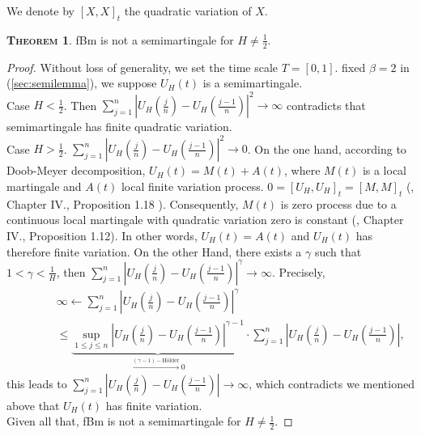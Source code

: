 \documentclass[a4paper, twoside, 11pt]{article}
\theoremstyle{definition}
\newtheorem{theorem}[definition]{\scshape Theorem}
\begin{document}
  We denote by $[X, X]_t$ the quadratic variation of $X$.
  \begin{theorem}
	fBm is not a semimartingale for $H\neq \frac{1}{2}$.
  \end{theorem}
  \begin{proof}
	Without loss of generality, we set the time scale $T=[0, 1]$. fixed $\beta=2$ in (\ref{sec:semilemma}), we suppose $U_H(t)$ is a semimartingale.\\
	Case $H < \frac{1}{2}$. Then $\sum_{j=1}^n |U_H(\frac{j}{n}) - U_H(\frac{j-1}{n})|^2\rightarrow\infty$ contradicts that semimartingale has finite quadratic variation.\\
	Case $H > \frac{1}{2}$. $\sum_{j=1}^n |U_H(\frac{j}{n}) - U_H(\frac{j-1}{n})|^2\rightarrow 0$. On the one hand, according to Doob-Meyer decomposition, $U_H(t) = M(t) + A(t)$, where $M(t)$ is a local martingale and $A(t)$ local finite variation process. 	
	 $0=[U_H, U_H]_t = [M, M]_t $  (\cite{revuz}, Chapter IV., Proposition 1.18 ). Consequently, $M(t)$ is zero process due to a continuous local martingale with quadratic variation zero is constant (\cite{revuz}, Chapter IV., Proposition 1.12).
  In other words, $U_H(t)=A(t)$ and $U_H(t)$ has therefore finite variation. On the other Hand, there exists a $\gamma$ such that $1<\gamma<\frac{1}{H}$,  then $\sum_{j=1}^n |U_H(\frac{j}{n}) - U_H(\frac{j-1}{n})|^\gamma \rightarrow \infty$. Precisely, 
	\begin{eqnarray*}
	   &&\infty \leftarrow \sum_{j=1}^n |U_H(\frac{j}{n}) - U_H(\frac{j-1}{n})|^\gamma\\
	   &\hspace{2em}&\le \underbrace{\sup\limits_{1\le j\le n}|U_H(\frac{j}{n}) - U_H(\frac{j-1}{n})|^{\gamma-1}}_{\overset{(\gamma-1)-\text{H\"older}}{\rightarrow}0} \cdot \sum_{j=1}^n|U_H(\frac{j}{n}) - U_H(\frac{j-1}{n})|,
	\end{eqnarray*}
	this leads to $\sum_{j=1}^n|U_H(\frac{j}{n}) - U_H(\frac{j-1}{n})|\rightarrow \infty$, which contradicts we mentioned above that $U_H(t)$ has finite variation.\\
	Given all that, fBm is not a semimartingale for $H\neq \frac{1}{2}$.
  \end{proof}
\end{document}
